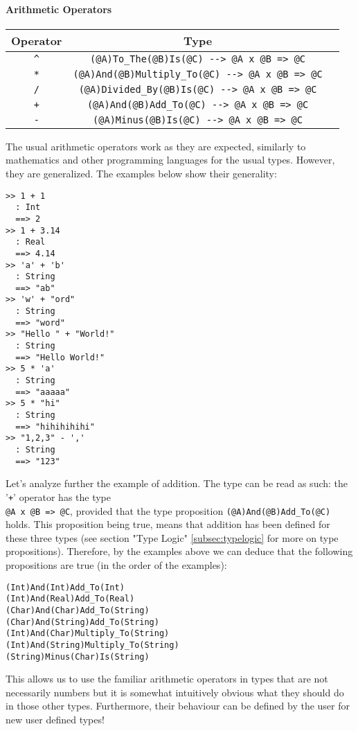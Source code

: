\documentclass[diploma]{softlab-thesis}
\begin{document}
\paragraph{Arithmetic Operators}
\begin{center}
\begin{tabular}{ |c|c|c| }
\hline
Operator & Type
\\
\hline
\hline
\verb|^| & \verb|(@A)To_The(@B)Is(@C) --> @A x @B => @C|
\\
\hline
\verb|*| & \verb|(@A)And(@B)Multiply_To(@C) --> @A x @B => @C|
\\
\hline
\verb|/| & \verb|(@A)Divided_By(@B)Is(@C) --> @A x @B => @C|
\\
\hline
\verb|+| & \verb|(@A)And(@B)Add_To(@C) --> @A x @B => @C|
\\
\hline
\verb|-| & \verb|(@A)Minus(@B)Is(@C) --> @A x @B => @C|
\\
\hline
\end{tabular}
\end{center}
The usual arithmetic operators work as they are expected, similarly to
mathematics and other programming languages for the usual types. However, they
are generalized. The examples below show their generality:
\begin{verbatim}
>> 1 + 1
  : Int
  ==> 2
>> 1 + 3.14
  : Real
  ==> 4.14
>> 'a' + 'b'
  : String
  ==> "ab"
>> 'w' + "ord"
  : String
  ==> "word"
>> "Hello " + "World!"
  : String
  ==> "Hello World!"
>> 5 * 'a'
  : String
  ==> "aaaaa"
>> 5 * "hi"
  : String
  ==> "hihihihihi"
>> "1,2,3" - ','
  : String
  ==> "123"
\end{verbatim}
Let's analyze further the example of addition. The type can be read as such:
the '\verb|+|' operator has the type \\ \verb|@A x @B => @C|, provided that the
type proposition \verb|(@A)And(@B)Add_To(@C)| holds. This proposition being
true, means that addition has been defined for these three types (see section
"Type Logic" \ref{subsec:typelogic} for more on type propositions). Therefore,
by the examples above we can deduce that the following propositions
are true (in the order of the examples):
\begin{verbatim}
(Int)And(Int)Add_To(Int)
(Int)And(Real)Add_To(Real)
(Char)And(Char)Add_To(String)
(Char)And(String)Add_To(String)
(Int)And(Char)Multiply_To(String)
(Int)And(String)Multiply_To(String)
(String)Minus(Char)Is(String)
\end{verbatim}
This allows us to use the familiar arithmetic operators in types that are not
necessarily numbers but it is somewhat intuitively obvious what they should do
in those other types. Furthermore, their behaviour can be defined by the user
for new user defined types!
\end{document}
